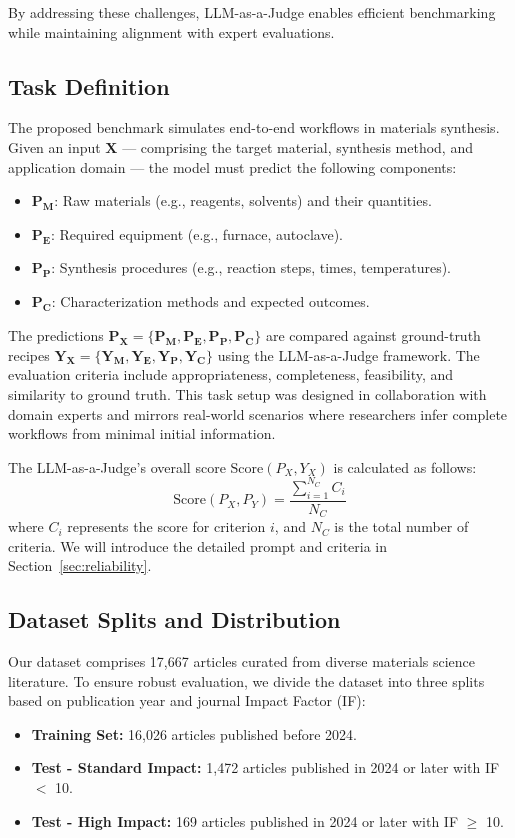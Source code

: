By addressing these challenges, LLM-as-a-Judge enables efficient benchmarking while maintaining alignment with expert evaluations.


\subsection{Task Definition}
\label{subsec:task_definition}
The proposed benchmark simulates end-to-end workflows in materials synthesis. Given an input $\mathbf{X}$ — comprising the target material, synthesis method, and application domain — the model must predict the following components:
\begin{itemize}
    \item $\mathbf{P_M}$: Raw materials (e.g., reagents, solvents) and their quantities.
    \item $\mathbf{P_E}$: Required equipment (e.g., furnace, autoclave).
    \item $\mathbf{P_P}$: Synthesis procedures (e.g., reaction steps, times, temperatures).
    \item $\mathbf{P_C}$: Characterization methods and expected outcomes.
\end{itemize}

The predictions $\mathbf{P_X}=\{\mathbf{P_M,P_E,P_P,P_C}\}$ are compared against ground-truth recipes $\mathbf{Y_X}=\{\mathbf{Y_M}, \mathbf{Y_E}, \mathbf{Y_P}, \mathbf{Y_C}\}$ using the LLM-as-a-Judge framework. The evaluation criteria include appropriateness, completeness, feasibility, and similarity to ground truth. This task setup was designed in collaboration with domain experts and mirrors real-world scenarios where researchers infer complete workflows from minimal initial information.

The LLM-as-a-Judge's overall score $\text{Score}(P_X,Y_X)$ is calculated as follows:
\[
\text{Score}(P_X, P_Y) = \frac{\sum_{i=1}^{N_C} C_i}{N_C}
\]
where $C_i$ represents the score for criterion $i$, and $N_C$ is the total number of criteria. We will introduce the detailed prompt and criteria in Section~\ref{sec:reliability}.

\subsection{Dataset Splits and Distribution}
Our dataset comprises 17,667 articles curated from diverse materials science literature. To ensure robust evaluation, we divide the dataset into three splits based on publication year and journal Impact Factor (IF):
\begin{itemize}
    \item \textbf{Training Set:} 16,026 articles published before 2024.
    \item \textbf{Test - Standard Impact:} 1,472 articles published in 2024 or later with IF $<$ 10.
    \item \textbf{Test - High Impact:} 169 articles published in 2024 or later with IF $\geq$ 10.
\end{itemize}

